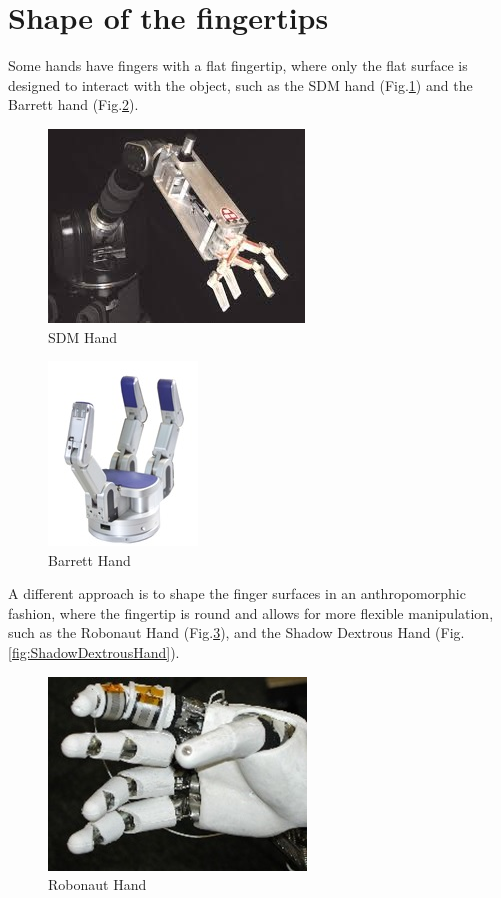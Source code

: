 \documentclass[a4paper, 10pt, conference]{ieeeconf}      %
\begin{document}
\section{\textbf{Shape of the fingertips}}
Some hands have fingers with a flat fingertip, where only the flat surface is designed to interact with the object, such as the SDM hand (Fig.\ref{fig:SDMHand}) and the Barrett hand (Fig.\ref{fig:BarrettHand}).\\
\begin{figure}[h!]
\centering  \includegraphics[scale=0.7]{./images/SDMHand}
  \caption{SDM Hand}
  \label{fig:SDMHand}
	\end{figure}
\begin{figure}[h!]
\centering  \includegraphics[scale=0.7]{./images/BarrettHand}
  \caption{Barrett Hand}
  \label{fig:BarrettHand}
	\end{figure}
A different approach is to shape the finger surfaces in an anthropomorphic fashion, where the fingertip is round and allows for more flexible manipulation, such as the Robonaut Hand (Fig.\ref{fig:RobonautHand}), and the Shadow Dextrous Hand (Fig.\ref{fig:ShadowDextrousHand}).\\
\begin{figure}[h!]
\centering  \includegraphics[scale=0.6]{./images/RobonautHand}
  \caption{Robonaut Hand}
  \label{fig:RobonautHand}
	\end{figure}
\end{document}
